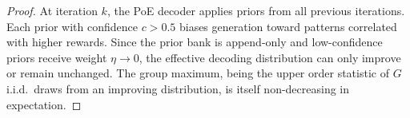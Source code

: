 \begin{proof}
At iteration $k$, the PoE decoder applies priors from all previous iterations.
Each prior with confidence $c > 0.5$ biases generation toward patterns
correlated with higher rewards. Since the prior bank is append-only and
low-confidence priors receive weight $\eta \to 0$, the effective decoding
distribution can only improve or remain unchanged. The group maximum, being the
upper order statistic of $G$ i.i.d.\ draws from an improving distribution, is
itself non-decreasing in expectation.
\end{proof}

